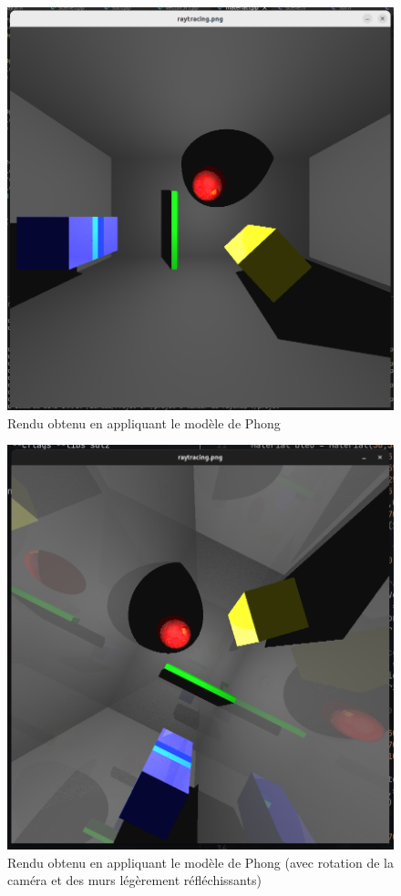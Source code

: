 \documentclass[a4paper,oneside,12pt,titlepage]{article}
\begin{document}
\begin{sloppypar}
\begin{figure}[!h]
    \centering
    \includegraphics[width=\linewidth]{./rendu_modele_phong.png}
    \caption{Rendu obtenu en appliquant le modèle de Phong}
    \label{fig:fig_rendu4}
\end{figure}

\begin{figure}[!h]
    \centering
    \includegraphics[width=\linewidth]{./rendu_modele_phong2.png}
    \caption{Rendu obtenu en appliquant le modèle de Phong (avec rotation de la caméra et des murs légèrement réfléchissants)}
    \label{fig:fig_rendu5}
\end{figure}

\end{sloppypar}
\end{document}

